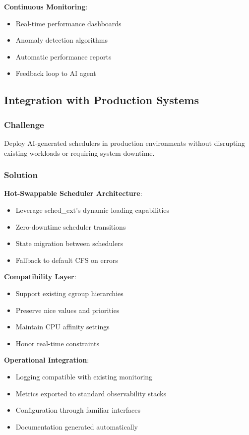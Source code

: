 \textbf{Continuous Monitoring}:
\begin{itemize}
\item Real-time performance dashboards
\item Anomaly detection algorithms
\item Automatic performance reports
\item Feedback loop to AI agent
\end{itemize}

\subsection{Integration with Production Systems}

\subsubsection{Challenge}
Deploy AI-generated schedulers in production environments without disrupting existing workloads or requiring system downtime.

\subsubsection{Solution}

\textbf{Hot-Swappable Scheduler Architecture}:
\begin{itemize}
\item Leverage sched\_ext's dynamic loading capabilities
\item Zero-downtime scheduler transitions
\item State migration between schedulers
\item Fallback to default CFS on errors
\end{itemize}

\textbf{Compatibility Layer}:
\begin{itemize}
\item Support existing cgroup hierarchies
\item Preserve nice values and priorities
\item Maintain CPU affinity settings
\item Honor real-time constraints
\end{itemize}

\textbf{Operational Integration}:
\begin{itemize}
\item Logging compatible with existing monitoring
\item Metrics exported to standard observability stacks
\item Configuration through familiar interfaces
\item Documentation generated automatically
\end{itemize}

